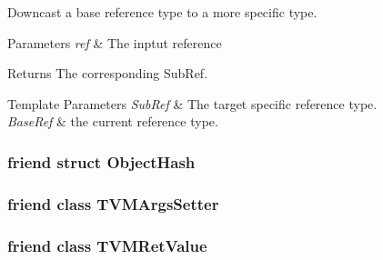 Downcast a base reference type to a more specific type. 


\begin{DoxyParams}{Parameters}
{\em ref} & The inptut reference \\
\hline
\end{DoxyParams}
\begin{DoxyReturn}{Returns}
The corresponding Sub\+Ref. 
\end{DoxyReturn}

\begin{DoxyTemplParams}{Template Parameters}
{\em Sub\+Ref} & The target specific reference type. \\
\hline
{\em Base\+Ref} & the current reference type. \\
\hline
\end{DoxyTemplParams}
\subsubsection[{\texorpdfstring{Object\+Hash}{ObjectHash}}]{\setlength{\rightskip}{0pt plus 5cm}friend struct {\bf Object\+Hash}\hspace{0.3cm}{\ttfamily [friend]}}\hypertarget{classtvm_1_1runtime_1_1ObjectRef_a7191cb82e9344bec1b5fd20f45b289f1}{}\label{classtvm_1_1runtime_1_1ObjectRef_a7191cb82e9344bec1b5fd20f45b289f1}
\subsubsection[{\texorpdfstring{T\+V\+M\+Args\+Setter}{TVMArgsSetter}}]{\setlength{\rightskip}{0pt plus 5cm}friend class {\bf T\+V\+M\+Args\+Setter}\hspace{0.3cm}{\ttfamily [friend]}}\hypertarget{classtvm_1_1runtime_1_1ObjectRef_a35ae555d4becf356b16aeacd353d41ee}{}\label{classtvm_1_1runtime_1_1ObjectRef_a35ae555d4becf356b16aeacd353d41ee}
\subsubsection[{\texorpdfstring{T\+V\+M\+Ret\+Value}{TVMRetValue}}]{\setlength{\rightskip}{0pt plus 5cm}friend class {\bf T\+V\+M\+Ret\+Value}\hspace{0.3cm}{\ttfamily [friend]}}\hypertarget{classtvm_1_1runtime_1_1ObjectRef_ae0ea8b4adc6dab8c74086bceaef6b3e1}{}\label{classtvm_1_1runtime_1_1ObjectRef_ae0ea8b4adc6dab8c74086bceaef6b3e1}



